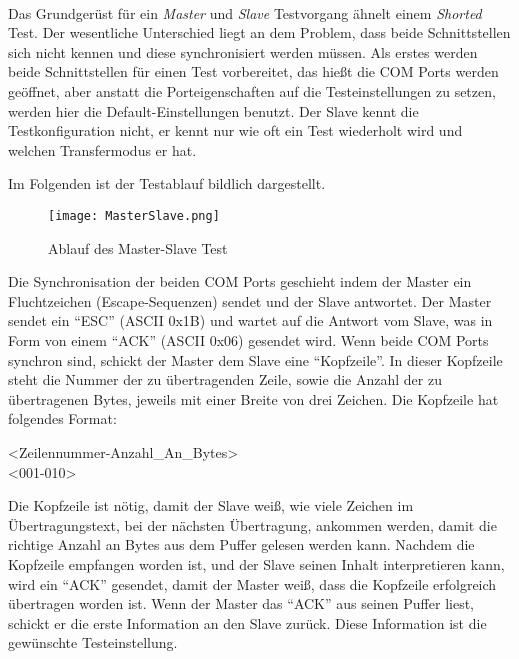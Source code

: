 \paragraph{}
Das Grundgerüst für ein \textit{Master} und \textit{Slave} Testvorgang ähnelt einem \textit{Shorted} Test. Der wesentliche Unterschied liegt an dem Problem, dass beide Schnittstellen sich nicht kennen und diese synchronisiert werden müssen. Als erstes werden beide Schnittstellen für einen Test vorbereitet, das hießt die COM Ports werden geöffnet, aber anstatt die Porteigenschaften auf die Testeinstellungen zu setzen, werden hier die Default-Einstellungen benutzt. Der Slave kennt die Testkonfiguration nicht, er kennt nur wie oft ein Test wiederholt wird und welchen Transfermodus er hat. 

\newpage

Im Folgenden ist der Testablauf bildlich dargestellt.\\

\begin{figure}[h]
  \begin{center}
    \texttt{[image: MasterSlave.png]}
  		  \caption{Ablauf des Master-Slave Test}
     \label{MasterSlaveDiagramm}
  \end{center}
\end{figure}




Die Synchronisation der beiden COM Ports geschieht indem der Master ein Fluchtzeichen (Escape-Sequenzen) sendet  und der Slave antwortet. Der Master sendet ein "`ESC"' (ASCII 0x1B) und wartet auf die Antwort vom Slave, was in Form von einem "`ACK"' (ASCII 0x06) gesendet wird. Wenn beide COM Ports synchron sind, schickt der Master dem Slave eine "`Kopfzeile"'. In dieser Kopfzeile steht die Nummer der zu übertragenden Zeile, sowie die Anzahl der zu übertragenen Bytes, jeweils mit einer Breite von drei Zeichen. Die Kopfzeile hat folgendes Format:

\begin{center}
<Zeilennummer-Anzahl\_An\_Bytes>\\

<001-010>
\end{center}

Die Kopfzeile ist nötig, damit der Slave weiß, wie viele Zeichen im Übertragungstext, bei der nächsten Übertragung, ankommen werden, damit die richtige Anzahl an Bytes aus dem Puffer gelesen werden kann. Nachdem die Kopfzeile empfangen worden ist, und der Slave seinen Inhalt interpretieren kann, wird ein "`ACK"' gesendet, damit der Master weiß, dass die Kopfzeile erfolgreich übertragen worden ist. Wenn der Master das "`ACK"' aus seinen Puffer liest, schickt er die erste Information an den Slave zurück. Diese Information ist die gewünschte Testeinstellung.

